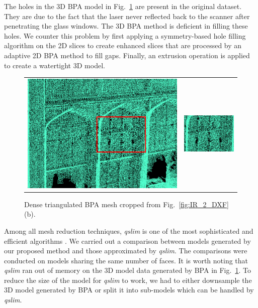 \documentclass[10pt,journal,cspaper,compsoc]{IEEEtran}
\newcommand{\Fig}[1]{Fig.~\ref{fig:#1}}
\newcommand{\Figb}[1]{Fig.~\ref{fig:#1}(b)}
\begin{document}
The holes in the 3D BPA model in \Fig{TH_BPA} are present in the
original dataset.
They are due to the fact that the laser never reflected back to
the scanner after penetrating the glass windows.
The 3D BPA method is deficient in filling these holes.
We counter this problem by first applying a symmetry-based hole filling
algorithm on the 2D slices to create enhanced slices that are processed
by an adaptive 2D BPA method to fill gaps.
Finally, an extrusion operation is applied to create a watertight 3D model.
\begin{figure}[htbp]
\begin{center} 
\begin{tabular}{cc}
\includegraphics[width=.22\textwidth]{BPA_TH.png} &
\includegraphics[width=.22\textwidth]{BPA_TH_1.png}
\end{tabular}
\end{center}
\caption{Dense triangulated BPA mesh cropped from \Figb{IR_2_DXF}.}
\label{fig:TH_BPA}
\end{figure}
Among all mesh reduction techniques, {\it qslim} is one of the most
sophisticated and efficient algorithms \cite{BPA_GH}.
We carried out a comparison between models generated by our proposed
method and those approximated by {\it qslim}.
The comparisons were conducted on models sharing the same number of faces.
It is worth noting that {\it qslim} ran out of memory on the 3D model data
generated by BPA in \Fig{TH_BPA}.
To reduce the size of the model for {\it qslim} to work, we had
to either downsample the 3D model generated by BPA or split it into
sub-models which can be handled by {\it qslim}.
\end{document}

